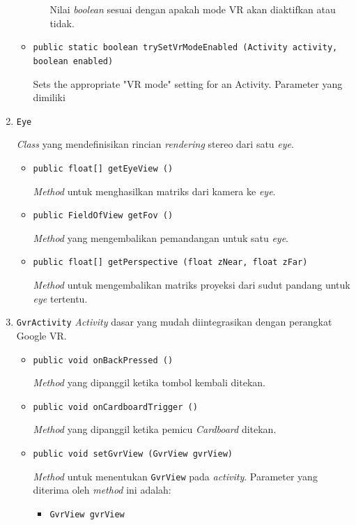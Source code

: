 \begin{enumerate}
\begin{itemize}
\begin{itemize}
					Nilai \textit{boolean} sesuai dengan apakah mode VR akan diaktifkan atau tidak.
				\end{itemize}
				\item \texttt{public static boolean trySetVrModeEnabled (Activity activity, boolean enabled)}
				
				Sets the appropriate "VR mode" setting for an Activity. Parameter yang dimiliki 
			\end{itemize}					
				
		
		\item \texttt{Eye}
		
		\textit{Class} yang mendefinisikan rincian \textit{rendering} stereo dari satu \textit{eye}. 
			\begin{itemize}
				\item \texttt{public float[] getEyeView ()}
				
				\textit{Method} untuk menghasilkan matriks dari kamera ke \textit{eye}.
				\item \texttt{public FieldOfView getFov ()}
				
				\textit{Method} yang mengembalikan pemandangan untuk satu \textit{eye}.
				\item \texttt{public float[] getPerspective (float zNear, float zFar)}
				
				\textit{Method} untuk mengembalikan matriks proyeksi dari sudut pandang untuk \textit{eye} tertentu.
			\end{itemize}
		
		\item \texttt{GvrActivity}
		\textit{Activity} dasar yang mudah diintegrasikan dengan perangkat Google VR. 
			\begin{itemize}
				\item \texttt{public void onBackPressed ()}
				
				\textit{Method} yang dipanggil ketika tombol kembali ditekan.
				\item \texttt{public void onCardboardTrigger ()}
				
				\textit{Method} yang dipanggil ketika pemicu \textit{Cardboard} ditekan.
				\item \texttt{public void setGvrView (GvrView gvrView)}
				
				\textit{Method} untuk menentukan \texttt{GvrView} pada \textit{activity}. Parameter yang diterima oleh \textit{method} ini adalah:
				
				\begin{itemize}
					\item \texttt{GvrView gvrView}
					

\end{itemize}
\end{itemize}
\end{enumerate}

